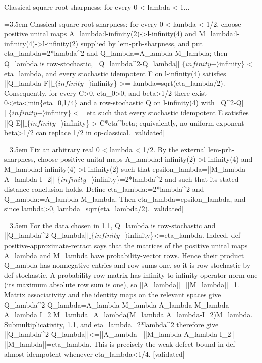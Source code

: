 \documentclass{article}
\newcommand{\step}[1]{\par\noindent\hangindent=3.5em\hangafter=1%
  \makebox[3.5em][l]{\textbf{#1.}}}
\newcommand{\steptag}[1]{\hfill{\small\textsf{[#1]}}}
\begin{document}
\begin{proofbox}{Classical square-root sharpness: for every 0 < lambda < 1...}
\step{1} Classical square-root sharpness: for every 0 < lambda < 1/2, choose positive unital maps A\_lambda:l-infinity(2)->l-infinity(4) and M\_lambda:l-infinity(4)->l-infinity(2) supplied by lem-prh-sharpness, and put eta\_lambda=2*lambda\textasciicircum{}2 and Q\_lambda=A\_lambda M\_lambda; then Q\_lambda is row-stochastic, ||Q\_lambda\textasciicircum{}2-Q\_lambda|$|\_\{infinity-\rangle$infinity\} <= eta\_lambda, and every stochastic idempotent F on l-infinity(4) satisfies ||Q\_lambda-F|$|\_\{infinity-\rangle$infinity\} >= lambda=sqrt(eta\_lambda/2). Consequently, for every C>0, eta\_0>0, and beta>1/2 there exist 0<eta<min\{eta\_0,1/4\} and a row-stochastic Q on l-infinity(4) with ||Q\textasciicircum{}2-Q|$|\_\{infinity-\rangle$infinity\} <= eta such that every stochastic idempotent E satisfies ||Q-E|$|\_\{infinity-\rangle$infinity\} > C*eta\textasciicircum{}beta; equivalently, no uniform exponent beta>1/2 can replace 1/2 in op-classical. \steptag{validated} \\[6pt]
\step{1.1} Fix an arbitrary real 0 < lambda < 1/2. By the external lem-prh-sharpness, choose positive unital maps A\_lambda:l-infinity(2)->l-infinity(4) and M\_lambda:l-infinity(4)->l-infinity(2) such that epsilon\_lambda=||M\_lambda A\_lambda-I\_2|$|\_\{infinity-\rangle$infinity\}=2*lambda\textasciicircum{}2 and such that its stated distance conclusion holds. Define eta\_lambda:=2*lambda\textasciicircum{}2 and Q\_lambda:=A\_lambda M\_lambda. Then eta\_lambda=epsilon\_lambda, and since lambda>0, lambda=sqrt(eta\_lambda/2). \steptag{validated} \\[4pt]
\step{1.2} For the data chosen in 1.1, Q\_lambda is row-stochastic and ||Q\_lambda\textasciicircum{}2-Q\_lambda|$|\_\{infinity-\rangle$infinity\}<=eta\_lambda. Indeed, def-positive-approximate-retract says that the matrices of the positive unital maps A\_lambda and M\_lambda have probability-vector rows. Hence their product Q\_lambda has nonnegative entries and row sums one, so it is row-stochastic by def-stochastic. A probability-row matrix has infinity-to-infinity operator norm one (its maximum absolute row sum is one), so ||A\_lambda||=||M\_lambda||=1. Matrix associativity and the identity maps on the relevant spaces give Q\_lambda\textasciicircum{}2-Q\_lambda=A\_lambda M\_lambda A\_lambda M\_lambda-A\_lambda I\_2 M\_lambda=A\_lambda(M\_lambda A\_lambda-I\_2)M\_lambda. Submultiplicativity, 1.1, and eta\_lambda=2*lambda\textasciicircum{}2 therefore give ||Q\_lambda\textasciicircum{}2-Q\_lambda||<=||A\_lambda|| ||M\_lambda A\_lambda-I\_2|| ||M\_lambda||=eta\_lambda. This is precisely the weak defect bound in def-almost-idempotent whenever eta\_lambda<1/4. \steptag{validated} \\[4pt]

\end{proofbox}
\end{document}

